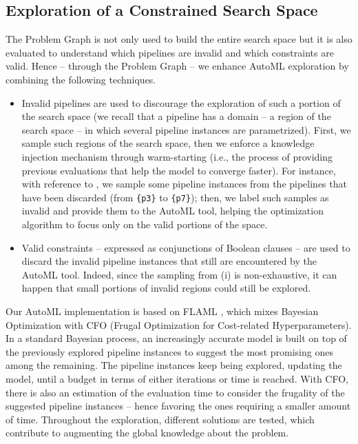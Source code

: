 \documentclass[5p,times]{elsarticle}
\begin{document}
\subsection{Exploration of a Constrained Search Space}\label{subsec:constrained_automl}

The Problem Graph is not only used to build the entire search space but it is also evaluated to understand which pipelines are invalid and which constraints are valid.
Hence -- through the Problem Graph -- we enhance AutoML exploration by combining the following techniques.
\begin{itemize}
    \item[(i)] Invalid pipelines are used to discourage the exploration of such a portion of the search space (we recall that a pipeline has a domain -- a region of the search space -- in which several pipeline instances are parametrized).
    First, we sample such regions of the search space, then we enforce a knowledge injection mechanism through warm-starting (i.e., the process of providing previous evaluations that help the model to converge faster).
    For instance, with reference to , we sample some pipeline instances from the pipelines that have been discarded (from \texttt{\{p3\}} to \texttt{\{p7\}});
    then, we label such samples as invalid and provide them to the AutoML tool, helping the optimization algorithm to focus only on the valid portions of the space.
    \item[(ii)] Valid constraints -- expressed as conjunctions of Boolean clauses -- are used to discard the invalid pipeline instances that still are encountered by the AutoML tool.
    Indeed, since the sampling from (i) is non-exhaustive, it can happen that small portions of invalid regions could still be explored.
\end{itemize}

Our AutoML implementation is based on FLAML \cite{wang2021flaml}, which mixes Bayesian Optimization with CFO (Frugal Optimization for Cost-related Hyperparameters).
In a standard Bayesian process, an increasingly accurate model is built on top of the previously explored pipeline instances to suggest the most promising ones among the remaining.
The pipeline instances keep being explored, updating the model, until a budget in terms of either iterations or time is reached.
With CFO, there is also an estimation of the evaluation time to consider the frugality of the suggested pipeline instances -- hence favoring the ones requiring a smaller amount of time.
Throughout the exploration, different solutions are tested, which contribute to augmenting the global knowledge about the problem.
\vspace{1cm}
\end{document}

